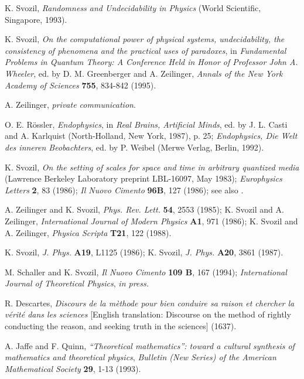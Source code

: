 \begin{thebibliography}{99}
K. Svozil,  {\sl Randomness and Undecidability in Physics}
(World Scientific, Singapore, 1993).

 K. Svozil,
{\sl On the computational power of physical systems,
undecidability, the consistency of phenomena and
 the practical uses of paradoxes},
in {\sl Fundamental Problems in
Quantum Theory: A Conference Held in Honor of Professor John A.
Wheeler}, ed. by D. M. Greenberger and A. Zeilinger,  {\sl Annals of the
New York Academy of Sciences} {\bf 755}, 834-842 (1995).

A. Zeilinger, {\it private communication}.

 O. E. R\"ossler, {\sl Endophysics}, in {\sl Real Brains, Artificial
 Minds}, ed. by J. L. Casti and A. Karlquist (North-Holland, New
 York, 1987), p. 25;
{\sl Endophysics, Die Welt des inneren Beobachters},
 ed. by P. Weibel (Merwe Verlag, Berlin, 1992).

 K. Svozil,
 {\sl On the setting of scales for space and time in arbitrary
 quantized media}  (Lawrence Berkeley Laboratory preprint
 LBL-16097, May 1983);
{\sl Europhysics Letters} {\bf 2}, 83 (1986);
 {\sl Il Nuovo Cimento} {\bf 96B}, 127 (1986); see also
\cite{svozil-93}.

A. Zeilinger and K. Svozil, {\sl Phys. Rev. Lett.}
{\bf 54}, 2553 (1985);
 K. Svozil  and A. Zeilinger,
{\sl International Journal of Modern Physics} {\bf A1}, 971 (1986);
K. Svozil and A. Zeilinger,
{\sl Physica Scripta} {\bf T21}, 122 (1988).

 K. Svozil,
{\sl J. Phys.} {\bf A19}, L1125 (1986);
K. Svozil, {\sl J. Phys.} {\bf A20}, 3861 (1987).

 M. Schaller and K. Svozil, {\sl Il Nuovo Cimento} {\bf 109 B}, 167
(1994); {\sl International Journal of Theoretical Physics}, {\it in
press.}

R. Descartes, {\sl Discours de la m\`{e}thode pour bien conduire sa
raison et chercher la v\'{e}rit\'{e} dans les sciences}
[English translation: Discourse on the method of rightly conducting the
reason, and seeking truth in the sciences] (1637).

A. Jaffe and F. Quinn,
{\sl ``Theoretical mathematics'': toward a cultural synthesis of
mathematics and theoretical physics},
{\sl Bulletin (New Series) of the American Mathematical Society}
{\bf 29}, 1-13 (1993).


\end{thebibliography}
